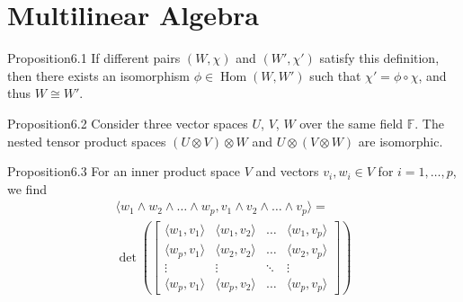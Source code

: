 \section{Multilinear Algebra}

\begin{res}{Proposition}{6.1}
If different pairs $(W,\chi)$ and $(W',\chi')$ satisfy this definition, then there exists an isomorphism $\phi\in\operatorname{Hom}(W,W')$ such that $\chi'=\phi\circ\chi$, and thus $W\cong W'$.
\end{res}

\begin{res}{Proposition}{6.2}
Consider three vector spaces $U$, $V$, $W$ over the same field $\mathbb F$. The nested tensor product spaces $(U\otimes V)\otimes W$ and $U\otimes(V\otimes W)$ are isomorphic.
\end{res}

\begin{res}{Proposition}{6.3}
For an inner product space $V$ and vectors $v_i,w_i\in V$ for $i=1,\dots,p$, we find
\begin{multline}\langle w_1\wedge w_2\wedge\dots\wedge w_p,v_1\wedge v_2\wedge\dots\wedge v_p\rangle=\\
\det\left(\begin{bmatrix}\langle w_1,v_1\rangle&\langle w_1,v_2\rangle&\ldots&\langle w_1,v_p\rangle\\\langle w_p,v_1\rangle&\langle w_2,v_2\rangle&\ldots&\langle w_2,v_p\rangle\\\vdots&\vdots&\ddots&\vdots\\\langle w_p,v_1\rangle&\langle w_p,v_2\rangle&\ldots&\langle w_p,v_p\rangle\end{bmatrix}\right)\tag{6.31}\end{multline}
\end{res}
